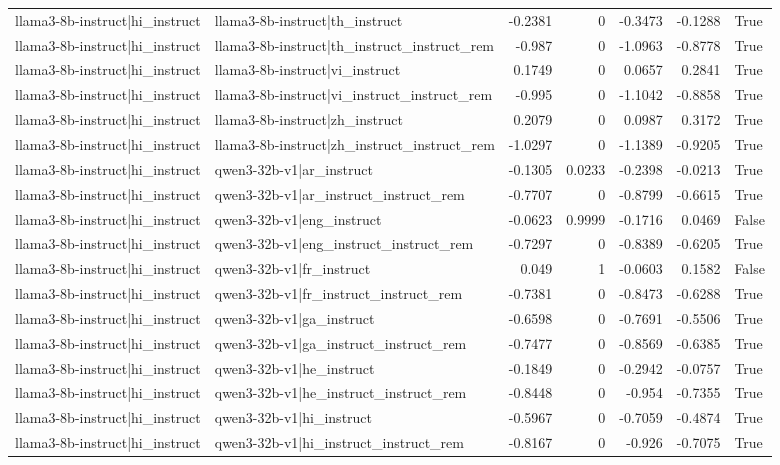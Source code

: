 \begin{table}
\begin{tabular}{l l r r r r l}
llama3-8b-instruct|hi_instruct & llama3-8b-instruct|th_instruct & -0.2381 & 0 & -0.3473 & -0.1288 & True \\
llama3-8b-instruct|hi_instruct & llama3-8b-instruct|th_instruct_instruct_rem & -0.987 & 0 & -1.0963 & -0.8778 & True \\
llama3-8b-instruct|hi_instruct & llama3-8b-instruct|vi_instruct & 0.1749 & 0 & 0.0657 & 0.2841 & True \\
llama3-8b-instruct|hi_instruct & llama3-8b-instruct|vi_instruct_instruct_rem & -0.995 & 0 & -1.1042 & -0.8858 & True \\
llama3-8b-instruct|hi_instruct & llama3-8b-instruct|zh_instruct & 0.2079 & 0 & 0.0987 & 0.3172 & True \\
llama3-8b-instruct|hi_instruct & llama3-8b-instruct|zh_instruct_instruct_rem & -1.0297 & 0 & -1.1389 & -0.9205 & True \\
llama3-8b-instruct|hi_instruct & qwen3-32b-v1|ar_instruct & -0.1305 & 0.0233 & -0.2398 & -0.0213 & True \\
llama3-8b-instruct|hi_instruct & qwen3-32b-v1|ar_instruct_instruct_rem & -0.7707 & 0 & -0.8799 & -0.6615 & True \\
llama3-8b-instruct|hi_instruct & qwen3-32b-v1|eng_instruct & -0.0623 & 0.9999 & -0.1716 & 0.0469 & False \\
llama3-8b-instruct|hi_instruct & qwen3-32b-v1|eng_instruct_instruct_rem & -0.7297 & 0 & -0.8389 & -0.6205 & True \\
llama3-8b-instruct|hi_instruct & qwen3-32b-v1|fr_instruct & 0.049 & 1 & -0.0603 & 0.1582 & False \\
llama3-8b-instruct|hi_instruct & qwen3-32b-v1|fr_instruct_instruct_rem & -0.7381 & 0 & -0.8473 & -0.6288 & True \\
llama3-8b-instruct|hi_instruct & qwen3-32b-v1|ga_instruct & -0.6598 & 0 & -0.7691 & -0.5506 & True \\
llama3-8b-instruct|hi_instruct & qwen3-32b-v1|ga_instruct_instruct_rem & -0.7477 & 0 & -0.8569 & -0.6385 & True \\
llama3-8b-instruct|hi_instruct & qwen3-32b-v1|he_instruct & -0.1849 & 0 & -0.2942 & -0.0757 & True \\
llama3-8b-instruct|hi_instruct & qwen3-32b-v1|he_instruct_instruct_rem & -0.8448 & 0 & -0.954 & -0.7355 & True \\
llama3-8b-instruct|hi_instruct & qwen3-32b-v1|hi_instruct & -0.5967 & 0 & -0.7059 & -0.4874 & True \\
llama3-8b-instruct|hi_instruct & qwen3-32b-v1|hi_instruct_instruct_rem & -0.8167 & 0 & -0.926 & -0.7075 & True \\

\end{tabular}
\end{table}
